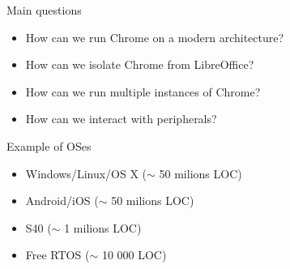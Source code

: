 \documentclass{beamer}
\begin{document}
\begin{frame}{Main questions}
  \begin{itemize}
    \item How can we run Chrome on a modern architecture?
    \item How can we isolate Chrome from LibreOffice?
    \item How can we run multiple instances of Chrome?
    \item How can we interact with peripherals?
  \end{itemize}
\end{frame}

\begin{frame}[t]{Example of OSes}
  \begin{itemize}
  \item Windows/Linux/OS X ($\sim$ 50 milions LOC)
  \item Android/iOS ($\sim$ 50 milions LOC)
  \item<2-> S40 ($\sim$ 1 milions LOC)
  \item<3-> Free RTOS ($\sim$ 10 000 LOC)
  \end{itemize}
  \begin{center}
  \end{center}
\end{frame}
\end{document}
